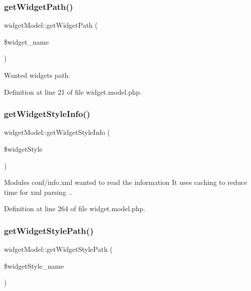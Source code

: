 \subsubsection{\texorpdfstring{get\+Widget\+Path()}{getWidgetPath()}}
{\footnotesize\ttfamily widget\+Model\+::get\+Widget\+Path (\begin{DoxyParamCaption}\item[{}]{\$widget\+\_\+name }\end{DoxyParamCaption})}



Wanted widget\textquotesingle{}s path. 



Definition at line 21 of file widget.\+model.\+php.

\hypertarget{classwidgetModel_a185fc0ca0bcf22fd6efb045ce8912e47}{}\label{classwidgetModel_a185fc0ca0bcf22fd6efb045ce8912e47} 
\subsubsection{\texorpdfstring{get\+Widget\+Style\+Info()}{getWidgetStyleInfo()}}
{\footnotesize\ttfamily widget\+Model\+::get\+Widget\+Style\+Info (\begin{DoxyParamCaption}\item[{}]{\$widget\+Style }\end{DoxyParamCaption})}



Modules conf/info.\+xml wanted to read the information It uses caching to reduce time for xml parsing .. 



Definition at line 264 of file widget.\+model.\+php.

\hypertarget{classwidgetModel_ae292d21337c4deb9ba7b4c0b4d794f0e}{}\label{classwidgetModel_ae292d21337c4deb9ba7b4c0b4d794f0e} 
\subsubsection{\texorpdfstring{get\+Widget\+Style\+Path()}{getWidgetStylePath()}}
{\footnotesize\ttfamily widget\+Model\+::get\+Widget\+Style\+Path (\begin{DoxyParamCaption}\item[{}]{\$widget\+Style\+\_\+name }\end{DoxyParamCaption})}



